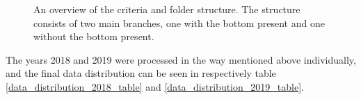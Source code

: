         \begin{figure}[H]
            \centering
            
            


            \caption[Criteria and folder structure]{An overview of the criteria and folder structure. The structure consists of two main branches, one with the bottom present and one without the bottom present.}
            
            
          	\medskip 
            \label{data_hierarchy_fig}
        \end{figure}
        \clearpage
        The years 2018 and 2019 were processed in the way mentioned above individually, and the final data distribution can be seen in respectively table \ref{data_distribution_2018_table} and \ref{data_distribution_2019_table}.



